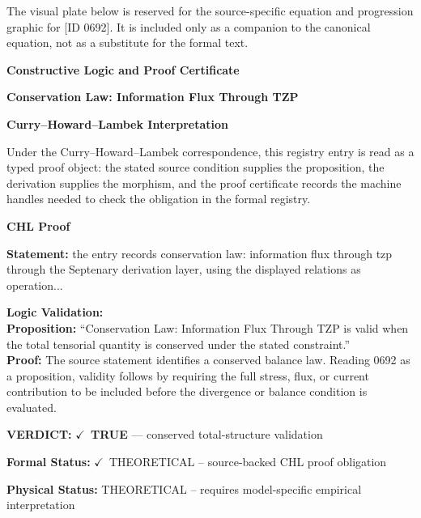 \begingroup\footnotesize\sloppy
The visual plate below is reserved for the source-specific equation and progression graphic for [ID 0692]. It is included only as a companion to the canonical equation, not as a substitute for the formal text.
\par\endgroup
\ifTZPDarkEdition
{}
\fi

\clearpage
\begingroup\tzpsupportsetup
\noindent\textbf{\fontsize{10.8pt}{12.8pt}\selectfont [ID 0692] Constructive Logic and Proof Certificate}\par
\noindent\textbf{\fontsize{10pt}{12pt}\selectfont Conservation Law: Information Flux Through TZP}\par
\vspace{0.45em}
\begingroup
\footnotesize
\setlength{\parskip}{0.22em}
\setlength{\parindent}{0pt}
\noindent\textbf{Curry--Howard--Lambek Interpretation}\par
Under the Curry--Howard--Lambek correspondence, this registry entry is read as a typed proof
object: the stated source condition supplies the proposition, the derivation supplies the
morphism, and the proof certificate records the machine handles needed to check the obligation
in the formal registry.

\vspace{0.45em}
\noindent\textbf{CHL Proof}\par
\textbf{Statement:} the entry records conservation law: information flux through tzp through the Septenary
derivation layer, using the displayed relations as operation...

\textbf{Logic Validation:}\\
\textbf{Proposition:} ``Conservation Law: Information Flux Through TZP is valid when the total tensorial
quantity is conserved under the stated constraint.''\\
\textbf{Proof:} The source statement identifies a conserved balance law. Reading 0692 as a proposition,
validity follows by requiring the full stress, flux, or current contribution to be
included before the divergence or balance condition is evaluated.

\textbf{VERDICT:} \ensuremath{\checkmark}\ \textbf{TRUE} --- conserved total-structure validation

\textbf{Formal Status:} \ensuremath{\checkmark}\ THEORETICAL -- source-backed CHL proof obligation

\textbf{Physical Status:} THEORETICAL -- requires model-specific empirical interpretation
\par\vspace{0.45em}
\par
\ifTZPDarkEdition
{}
\fi
\endgroup
\endgroup
